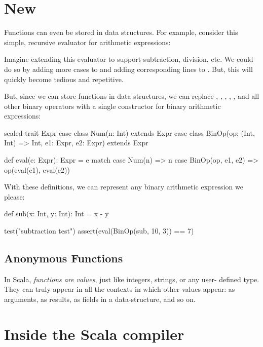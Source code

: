 \documentclass{book}
\begin{document}
\section{New}


Functions can even be stored in data structures. For example, consider
this simple, recursive evaluator for arithmetic expressions:


Imagine extending this evaluator to support subtraction, division, etc.
We could do so by adding more cases to  and adding corresponding
lines to . But, this will quickly become tedious and repetitive.

But, since we can store functions in data structures, we can replace
, , , , , and all other binary operators with
a single constructor for binary arithmetic expressions:

\begin{scalacode}
sealed trait Expr
case class Num(n: Int) extends Expr
case class BinOp(op: (Int, Int) => Int, e1: Expr, e2: Expr) extends Expr

def eval(e: Expr): Expr = e match {
  case Num(n) => n
  case BinOp(op, e1, e2) => op(eval(e1), eval(e2))
}
\end{scalacode}

With these definitions, we can represent any binary arithmetic expression
we please:

\begin{scalacode}
def sub(x: Int, y: Int): Int = x - y

test("subtraction test") {
  assert(eval(BinOp(sub, 10, 3)) == 7)
}
\end{scalacode}

\subsection{Anonymous Functions}

In Scala, \emph{functions are values}, just like integers, strings, or any user-
defined type. They can truly appear in all the contexts in which other values
appear: as arguments, as results, as fields in a data-structure, and so on.

\newlecture

\section{Inside the Scala compiler}
\end{document}
